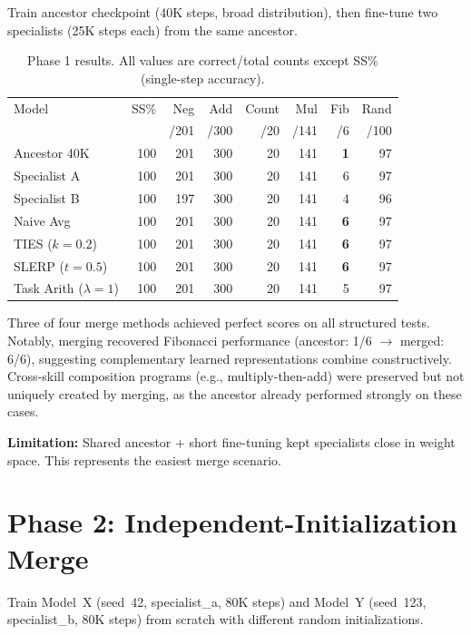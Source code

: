 \documentclass[11pt,a4paper]{article}
\begin{document}
Train ancestor checkpoint (40K steps, broad distribution), then fine-tune two specialists (25K steps each) from the same ancestor.

\begin{table}[h]
\centering
\caption{Phase 1 results. All values are correct/total counts except SS\% (single-step accuracy).}
\label{tab:phase1}
\begin{tabular}{@{}lrrrrrrr@{}}
\toprule
Model & SS\% & Neg & Add & Count & Mul & Fib & Rand \\
 & & /201 & /300 & /20 & /141 & /6 & /100 \\
\midrule
Ancestor 40K & 100 & 201 & 300 & 20 & 141 & \textbf{1} & 97 \\
Specialist A & 100 & 201 & 300 & 20 & 141 & 6 & 97 \\
Specialist B & 100 & 197 & 300 & 20 & 141 & 4 & 96 \\
\midrule
Naive Avg & 100 & 201 & 300 & 20 & 141 & \textbf{6} & 97 \\
TIES ($k{=}0.2$) & 100 & 201 & 300 & 20 & 141 & \textbf{6} & 97 \\
SLERP ($t{=}0.5$) & 100 & 201 & 300 & 20 & 141 & \textbf{6} & 97 \\
Task Arith ($\lambda{=}1$) & 100 & 201 & 300 & 20 & 141 & 5 & 97 \\
\bottomrule
\end{tabular}
\end{table}

Three of four merge methods achieved perfect scores on all structured tests. Notably, merging recovered Fibonacci performance (ancestor: 1/6 $\to$ merged: 6/6), suggesting complementary learned representations combine constructively. Cross-skill composition programs (e.g., multiply-then-add) were preserved but not uniquely created by merging, as the ancestor already performed strongly on these cases.

\textbf{Limitation:} Shared ancestor + short fine-tuning kept specialists close in weight space. This represents the easiest merge scenario.

\section{Phase 2: Independent-Initialization Merge}

Train Model~X (seed~42, specialist\_a, 80K steps) and Model~Y (seed~123, specialist\_b, 80K steps) from scratch with different random initializations.
\end{document}
